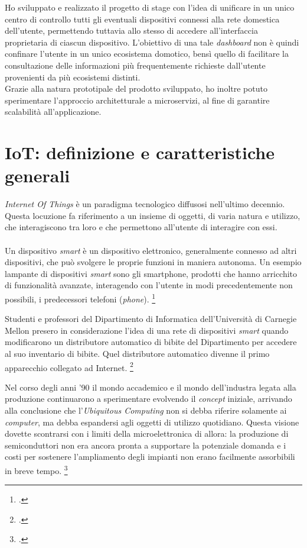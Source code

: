 Ho sviluppato e realizzato il progetto di stage con l'idea di unificare in un unico centro di controllo tutti gli eventuali dispositivi connessi alla rete domestica dell'utente, permettendo tuttavia allo stesso di accedere all'interfaccia proprietaria di ciascun dispositivo.
L'obiettivo di una tale \emph{dashboard} non è quindi confinare l'utente in un unico ecosistema domotico,
bensì quello di facilitare la consultazione delle informazioni più frequentemente richieste dall'utente provenienti da più ecosistemi distinti. \\
Grazie alla natura prototipale del prodotto sviluppato, ho inoltre potuto sperimentare l'approccio architetturale a microservizi, al fine di garantire scalabilità all'applicazione.

\section{IoT: definizione e caratteristiche generali}
\label{intro-iot}

\emph{Internet Of Things} è un paradigma tecnologico diffusosi nell'ultimo decennio. Questa locuzione fa riferimento a un insieme di oggetti,
di varia natura e utilizzo, che interagiscono tra loro e che permettono all'utente di interagire con essi. \\ \\

Un dispositivo \emph{smart} è un dispositivo elettronico, generalmente connesso ad altri dispositivi, che può svolgere le proprie funzioni in maniera autonoma.
Un esempio lampante di dispositivi \emph{smart} sono gli smartphone, prodotti che hanno arricchito di funzionalità avanzate, interagendo con l'utente in modi precedentemente non possibili, i predecessori telefoni (\emph{phone}).
\footcite{site:smart-device}

Studenti e professori del Dipartimento di Informatica dell'Università di Carnegie Mellon presero in considerazione l'idea di una rete di dispositivi \emph{smart} quando modificarono un distributore automatico di bibite del Dipartimento per accedere al suo inventario di bibite. Quel distributore automatico divenne il primo apparecchio collegato ad Internet.
\footcite{site:mellon-uni}

Nel corso degli anni '90 il mondo accademico e il mondo dell'industra legata alla produzione continuarono a sperimentare evolvendo il \textit{concept} iniziale, arrivando alla conclusione che l'\textit{Ubiquitous Computing} non si debba riferire solamente ai \textit{computer}, ma debba espandersi agli oggetti di utilizzo quotidiano. Questa visione dovette scontrarsi con i limiti della microelettronica di allora: la produzione di semiconduttori non era ancora pronta a supportare la potenziale domanda e i costi per sostenere l'ampliamento degli impianti non erano facilmente assorbibili in breve tempo.
\footcite{site:mit-weiser}

